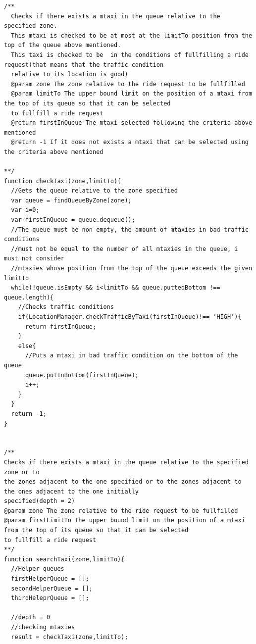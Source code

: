 \documentclass[11pt,titlepage]{article} %
\begin{document}
\begin{lstlisting}
/**
  Checks if there exists a mtaxi in the queue relative to the specified zone.
  This mtaxi is checked to be at most at the limitTo position from the top of the queue above mentioned.
  This taxi is checked to be  in the conditions of fullfilling a ride request(that means that the traffic condition
  relative to its location is good)
  @param zone The zone relative to the ride request to be fullfilled
  @param limitTo The upper bound limit on the position of a mtaxi from the top of its queue so that it can be selected
  to fullfill a ride request
  @return firstInQueue The mtaxi selected following the criteria above mentioned
  @return -1 If it does not exists a mtaxi that can be selected using the criteria above mentioned

**/
function checkTaxi(zone,limitTo){
  //Gets the queue relative to the zone specified
  var queue = findQueueByZone(zone);
  var i=0;
  var firstInQueue = queue.dequeue();
  //The queue must be non empty, the amount of mtaxies in bad traffic conditions
  //must not be equal to the number of all mtaxies in the queue, i must not consider
  //mtaxies whose position from the top of the queue exceeds the given limitTo
  while(!queue.isEmpty && i<limitTo && queue.puttedBottom !== queue.length){
    //Checks traffic conditions
    if(LocationManager.checkTrafficByTaxi(firstInQueue)!== 'HIGH'){
      return firstInQueue;
    }
    else{
      //Puts a mtaxi in bad traffic condition on the bottom of the queue
      queue.putInBottom(firstInQueue);
      i++;
    }
  }
  return -1;
}


/**
Checks if there exists a mtaxi in the queue relative to the specified zone or to
the zones adjacent to the one specified or to the zones adjacent to the ones adjacent to the one initially
specified(depth = 2)
@param zone The zone relative to the ride request to be fullfilled
@param firstLimitTo The upper bound limit on the position of a mtaxi from the top of its queue so that it can be selected
to fullfill a ride request
**/
function searchTaxi(zone,limitTo){
  //Helper queues
  firstHelperQueue = [];
  secondHelperQueue = [];
  thirdHeleprQueue = [];

  //depth = 0
  //checking mtaxies
  result = checkTaxi(zone,limitTo);


\end{lstlisting}
\end{document}
